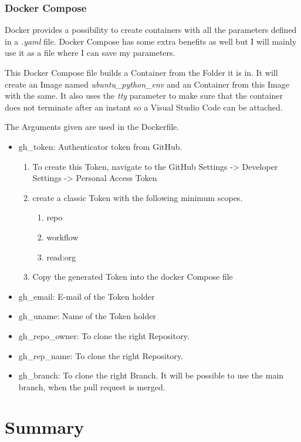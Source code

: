 \documentclass[a4paper, 12pt, oneside]{scrbook}
\begin{document}
		\noindent 
		
		\subsection{Docker Compose}
		
		
		Docker provides a possibility to create containers with all the parameters defined in a \textit{.yaml} file. Docker Compose has some extra benefits as well but I will mainly use it as a file where I can save my parameters. 
		
		\noindent This Docker Compose file builds a Container from the Folder it is in. It will create an Image named \textit{ubuntu\_python\_env} and an Container from this Image with the same. It also uses the \textit{tty} parameter to make sure that the container does not terminate after an instant so a Visual Studio Code can be attached. 
		
		\noindent The Arguments given are used in the Dockerfile. 
		
		\begin{itemize}
			\item gh\_token:  Authenticator token from GitHub. 
			\begin{enumerate}
				\item To create this Token, navigate to the GitHub Settings -> Developer Settings -> Personal Access Token
				\item create a classic Token with the following minimum scopes.
				\begin{enumerate}
					\item repo
					\item workflow
					\item read:org
				\end{enumerate}
				\item Copy the generated Token into the docker Compose file
			\end{enumerate}
			\item gh\_email:  E-mail of the Token holder
			\item gh\_uname:  Name of the Token holder
			\item gh\_repo\_owner:  To clone the right Repository.
			\item gh\_rep\_name:  To clone the right Repository.
			\item gh\_branch:  To clone the right Branch. It will be possible to use the main branch, when the pull request is merged.
		\end{itemize}
		
		\noindent 
		
	\chapter{Summary} %
	
	\frontmatter
	\printbibliography
\end{document}
